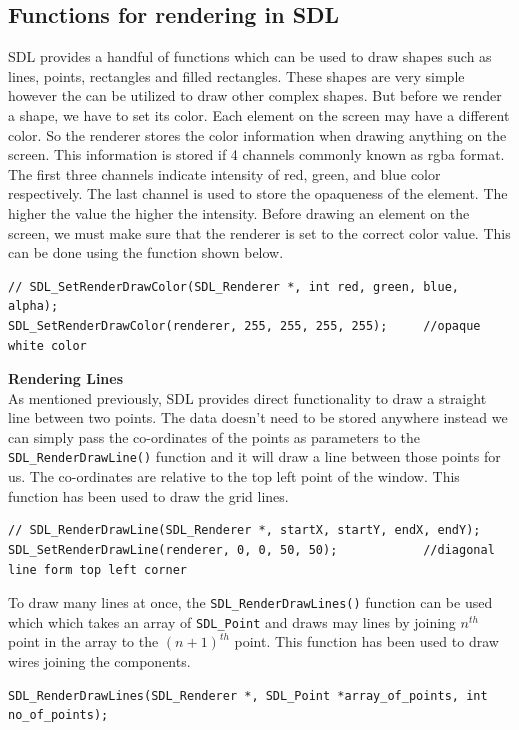 \documentclass[report]{subfiles}
\begin{document}
    \subsection{Functions for rendering in SDL}
    SDL provides a handful of functions which can be used to draw shapes such as lines, points, rectangles and filled rectangles. These shapes are very simple however the can be utilized to draw other complex shapes. But before we render a shape, we have to set its color.
    Each element on the screen may have a different color. So the renderer stores the color information when drawing anything on the screen. This information is stored if 4 channels commonly known as rgba format. The first three channels indicate intensity of red, green, and blue color respectively. The last channel is used to store the opaqueness of the element. The higher the value the higher the intensity. Before drawing an element on the screen, we must make sure that the renderer is set to the correct color value. This can be done using the function shown below.
\begin{lstlisting}
// SDL_SetRenderDrawColor(SDL_Renderer *, int red, green, blue, alpha);
SDL_SetRenderDrawColor(renderer, 255, 255, 255, 255);     //opaque white color
\end{lstlisting}
    \textbf{Rendering Lines}\\
    As mentioned previously, SDL provides direct functionality to draw a straight line between two points. The data doesn't need to be stored anywhere instead we can simply pass the co-ordinates of the points as parameters to the \texttt{SDL\_RenderDrawLine()} function and it will draw a line between those points for us. The co-ordinates are relative to the top left point of the window. This function has been used to draw the grid lines.
\begin{lstlisting}	
// SDL_RenderDrawLine(SDL_Renderer *, startX, startY, endX, endY);
SDL_SetRenderDrawLine(renderer, 0, 0, 50, 50);            //diagonal line form top left corner
\end{lstlisting}
To draw many lines at once, the \texttt{SDL\_RenderDrawLines()} function can be used which which takes an array of \texttt{SDL\_Point} and draws may lines by joining $n^{th}$ point in the array to the $(n + 1)^{th}$ point. This function has been used to draw wires joining the components.
\begin{lstlisting}	
SDL_RenderDrawLines(SDL_Renderer *, SDL_Point *array_of_points, int no_of_points);
\end{lstlisting}
\end{document}
